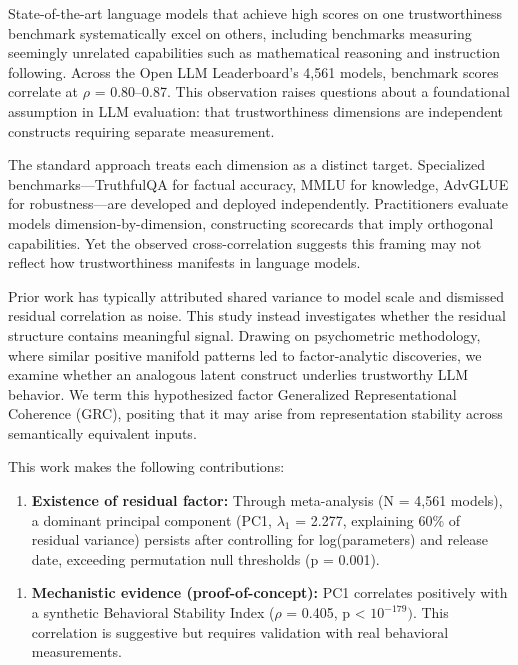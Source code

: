 
State-of-the-art language models that achieve high scores on one trustworthiness benchmark systematically excel on others, including benchmarks measuring seemingly unrelated capabilities such as mathematical reasoning and instruction following. Across the Open LLM Leaderboard's 4,561 models, benchmark scores correlate at $\rho$ = 0.80--0.87. This observation raises questions about a foundational assumption in LLM evaluation: that trustworthiness dimensions are independent constructs requiring separate measurement.

The standard approach treats each dimension as a distinct target. Specialized benchmarks---TruthfulQA for factual accuracy, MMLU for knowledge, AdvGLUE for robustness---are developed and deployed independently. Practitioners evaluate models dimension-by-dimension, constructing scorecards that imply orthogonal capabilities. Yet the observed cross-correlation suggests this framing may not reflect how trustworthiness manifests in language models.

Prior work has typically attributed shared variance to model scale and dismissed residual correlation as noise. This study instead investigates whether the residual structure contains meaningful signal. Drawing on psychometric methodology, where similar positive manifold patterns led to factor-analytic discoveries, we examine whether an analogous latent construct underlies trustworthy LLM behavior. We term this hypothesized factor Generalized Representational Coherence (GRC), positing that it may arise from representation stability across semantically equivalent inputs.

This work makes the following contributions:

\begin{enumerate}
\item \textbf{Existence of residual factor:} Through meta-analysis (N = 4,561 models), a dominant principal component (PC1, $\lambda _1$ = 2.277, explaining 60\% of residual variance) persists after controlling for log(parameters) and release date, exceeding permutation null thresholds (p = 0.001).
\end{enumerate}

\begin{enumerate}
\item \textbf{Mechanistic evidence (proof-of-concept):} PC1 correlates positively with a synthetic Behavioral Stability Index ($\rho$ = 0.405, p < $10^{-179})$. This correlation is suggestive but requires validation with real behavioral measurements.
\end{enumerate}

